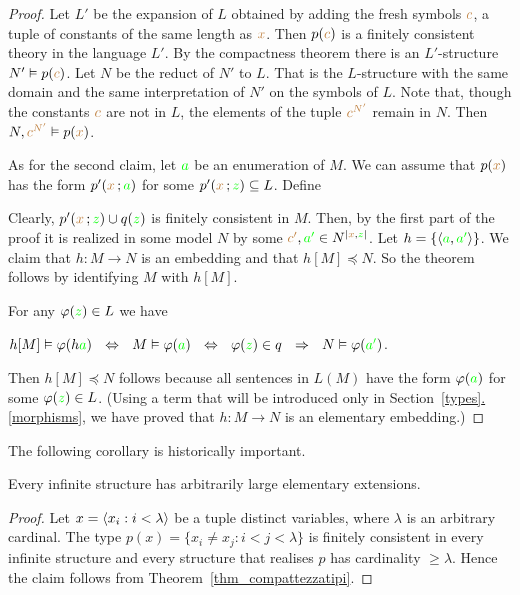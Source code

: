 \documentclass[creche.tex]{subfiles}
\begin{document}
\begin{proof}
Let $L'$ be the expansion of $L$ obtained by adding the fresh symbols ${\color{brown} c}$, a tuple of constants of the same length as ${\color{brown} x}$. Then $p({\color{brown} c})$ is a finitely consistent theory in the language $L'$. By the compactness theorem there is an $L'$-structure $N'\vDash p({\color{brown} c})$. Let $N$ be the reduct of $N'$ to $L$. That is the $L$-structure with the same domain and the same interpretation of $N'$ on the symbols of $L$. Note that, though the constants ${\color{brown} c}$ are not in $L$, the elements of the tuple ${\color{brown} c^{N'}}$ remain in $N$. Then $N,{\color{brown} c^{N'}}\vDash p({\color{brown} x})$.  

As for the second claim, let ${\color{green} a}$ be an enumeration of $M$. We can assume that $p({\color{brown} x})$ has the form $p'({\color{brown} x}\,;{\color{green} a})$ for some $p'({\color{brown} x}\,;{\color{green} z})\subseteq L$. Define


Clearly, $p'({\color{brown} x}\,;{\color{green} z})\cup q({\color{green} z})$ is finitely consistent in $M$. Then, by the first part of the proof it is realized in some model $N$ by some ${\color{brown} c'},{\color{green} a'}\in N^{|{\color{brown} x},{\color{green} z}|}$. Let $h=\{\langle{\color{green}a},{\color{green} a'}\rangle\}$. We claim that $h:M\to N$ is an embedding and that $h[M]\preceq N$. So the theorem follows by identifying $M$ with $h[M]$. 

For any $\varphi({\color{green} z})\in L$ we have

\hfil $h[M]\models\phi(h{\gr a})\ \ \IFF\ \  M\models \phi({\gr a})\ \  \IFF\ \  \phi({\gr z})\in q\ \   \IMP\ \  N\models \phi({\gr a'})$.

Then $h[M]\preceq N$ follows because all sentences in $L(M)$ have the form $\varphi({\color{green} a})$ for some $\varphi({\color{green} z})\in L$. (Using a term that will be introduced only in Section~\hyperref[morphisms]{\ref*{types}.\ref*{morphisms}}, we have proved that  $h:M\to N$ is an elementary embedding.)
\end{proof}

The following corollary is historically important.

\begin{void_thm}
Every infinite structure has arbitrarily large elementary extensions.
\end{void_thm}

\begin{proof}
Let $x=\langle x_i:i<\lambda\rangle$ be a tuple distinct variables, where $\lambda$ is an arbitrary cardinal. The type $p(x)=\big\{x_i\neq x_j: i<j<\lambda\big\}$ is finitely consistent in every infinite structure and every structure that realises $p$ has cardinality $\ge\lambda$. Hence the claim follows from Theorem~\ref{thm_compattezzatipi}.
\end{proof}
\end{document}
